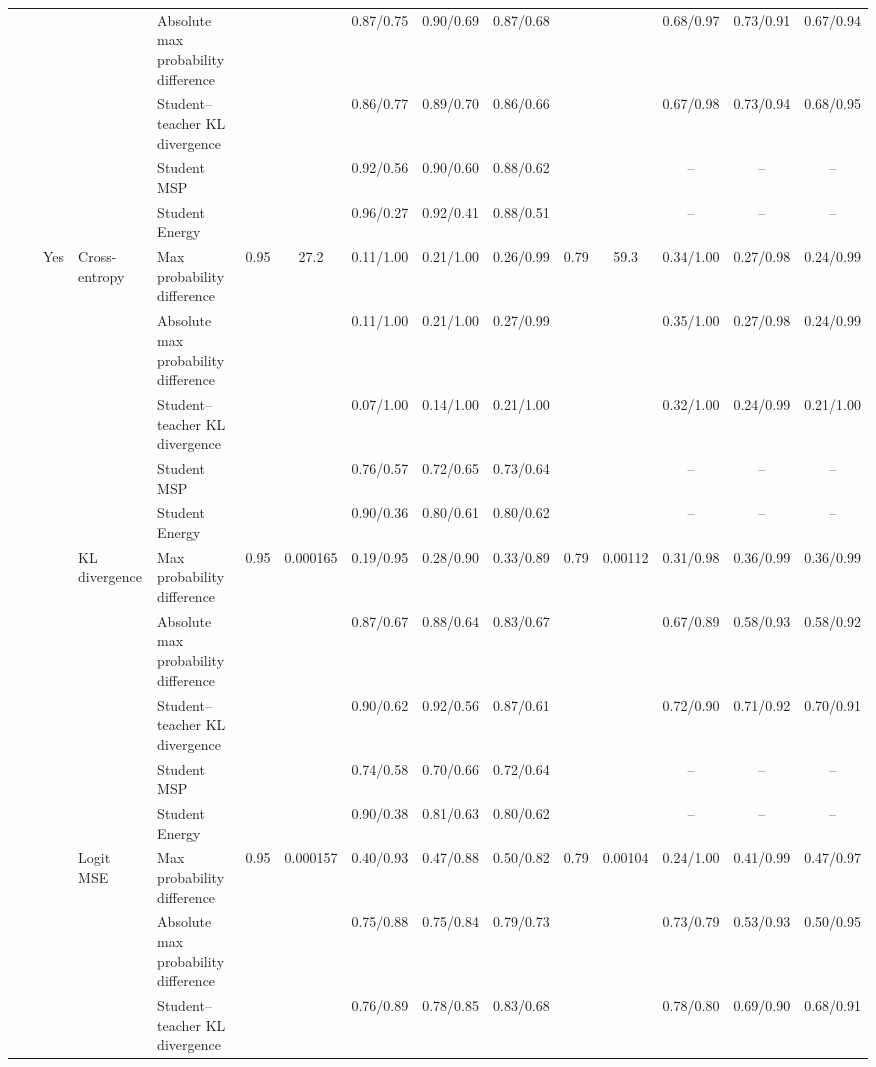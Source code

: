 \documentclass[border=2pt]{standalone}
\begin{document}
\begin{tabular}{lllllcccccccccc}
 &  &  &  & Absolute max probability difference &  &  & 0.87/0.75 & 0.90/0.69 & 0.87/0.68 &  &  & 0.68/0.97 & 0.73/0.91 & 0.67/0.94 \\
 &  &  &  & Student--teacher KL divergence &  &  & 0.86/0.77 & 0.89/0.70 & 0.86/0.66 &  &  & 0.67/0.98 & 0.73/0.94 & 0.68/0.95 \\
 &  &  &  & Student MSP &  &  & 0.92/0.56 & 0.90/0.60 & 0.88/0.62 &  &  & -- & -- & -- \\
 &  &  &  & Student Energy &  &  & 0.96/0.27 & 0.92/0.41 & 0.88/0.51 &  &  & -- & -- & -- \\
 &  & Yes & Cross-entropy & Max probability difference & 0.95 & 27.2 & 0.11/1.00 & 0.21/1.00 & 0.26/0.99 & 0.79 & 59.3 & 0.34/1.00 & 0.27/0.98 & 0.24/0.99 \\
 &  &  &  & Absolute max probability difference &  &  & 0.11/1.00 & 0.21/1.00 & 0.27/0.99 &  &  & 0.35/1.00 & 0.27/0.98 & 0.24/0.99 \\
 &  &  &  & Student--teacher KL divergence &  &  & 0.07/1.00 & 0.14/1.00 & 0.21/1.00 &  &  & 0.32/1.00 & 0.24/0.99 & 0.21/1.00 \\
 &  &  &  & Student MSP &  &  & 0.76/0.57 & 0.72/0.65 & 0.73/0.64 &  &  & -- & -- & -- \\
 &  &  &  & Student Energy &  &  & 0.90/0.36 & 0.80/0.61 & 0.80/0.62 &  &  & -- & -- & -- \\
 &  &  & KL divergence & Max probability difference & 0.95 & 0.000165 & 0.19/0.95 & 0.28/0.90 & 0.33/0.89 & 0.79 & 0.00112 & 0.31/0.98 & 0.36/0.99 & 0.36/0.99 \\
 &  &  &  & Absolute max probability difference &  &  & 0.87/0.67 & 0.88/0.64 & 0.83/0.67 &  &  & 0.67/0.89 & 0.58/0.93 & 0.58/0.92 \\
 &  &  &  & Student--teacher KL divergence &  &  & 0.90/0.62 & 0.92/0.56 & 0.87/0.61 &  &  & 0.72/0.90 & 0.71/0.92 & 0.70/0.91 \\
 &  &  &  & Student MSP &  &  & 0.74/0.58 & 0.70/0.66 & 0.72/0.64 &  &  & -- & -- & -- \\
 &  &  &  & Student Energy &  &  & 0.90/0.38 & 0.81/0.63 & 0.80/0.62 &  &  & -- & -- & -- \\
 &  &  & Logit MSE & Max probability difference & 0.95 & 0.000157 & 0.40/0.93 & 0.47/0.88 & 0.50/0.82 & 0.79 & 0.00104 & 0.24/1.00 & 0.41/0.99 & 0.47/0.97 \\
 &  &  &  & Absolute max probability difference &  &  & 0.75/0.88 & 0.75/0.84 & 0.79/0.73 &  &  & 0.73/0.79 & 0.53/0.93 & 0.50/0.95 \\
 &  &  &  & Student--teacher KL divergence &  &  & 0.76/0.89 & 0.78/0.85 & 0.83/0.68 &  &  & 0.78/0.80 & 0.69/0.90 & 0.68/0.91 \\

\end{tabular}
\end{document}

